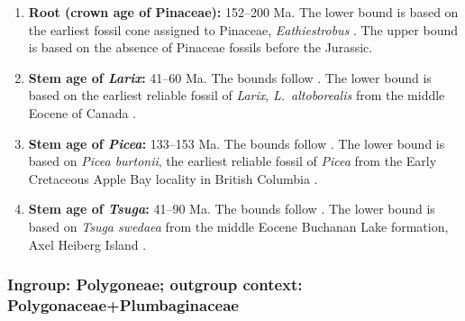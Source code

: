 
\begin{enumerate}
\item \textbf{Root (crown age of Pinaceae):} 152--200 Ma. The lower
  bound is based on the earliest fossil cone assigned to Pinaceae,
  \textit{Eathiestrobus} \citep{Rothwell2012}. The upper bound is
  based on the absence of Pinaceae fossils before the
  Jurassic.%

\item \textbf{Stem age of \textit{Larix}:} 41--60 Ma. The bounds
  follow \citet{Leslie2012}. The lower bound is based on the earliest
  reliable fossil of \textit{Larix}, \textit{L.~altoborealis} from the
  middle Eocene of Canada \citep{LePage1991}.

\item \textbf{Stem age of \textit{Picea}:} 133--153 Ma. The bounds
  follow \citet{Leslie2012}. The lower bound is based on \textit{Picea
    burtonii}, the earliest reliable fossil of \textit{Picea} from the
  Early Cretaceous Apple Bay locality in British Columbia
  \citep{Klymiuk2012}.

\item \textbf{Stem age of \textit{Tsuga}:} 41--90 Ma. The bounds
  follow \citet{Leslie2012}. The lower bound is based on \textit{Tsuga
    swedaea} from the middle Eocene Buchanan Lake formation, Axel
  Heiberg Island \citep{Lepage2003}.

\end{enumerate}

\subsubsection*{Ingroup: Polygoneae; outgroup context:
  Polygonaceae+Plumbaginaceae}

